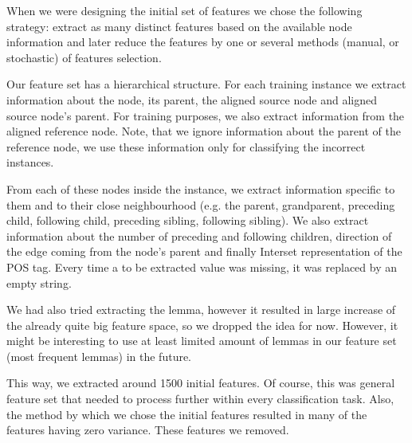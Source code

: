 When we were designing the initial set of features we chose the following
strategy: extract as many distinct features based on the available node information
and later reduce the features by one or several methods (manual, or stochastic)
of features selection.

Our feature set has a hierarchical structure. For each training instance we extract
information about the node, its parent, the aligned source node and aligned source node's
parent. For training purposes, we also extract information from the aligned reference
node. Note, that we ignore information about the parent of the reference node, we
use these information only for classifying the incorrect instances.

From each of these  nodes inside the instance, we extract information
specific to them and to their close neighbourhood (e.g. the parent, grandparent,
preceding child, following child, preceding sibling, following sibling). We
also extract information about the number of preceding and following children,
direction of the edge coming from the node's parent and finally Interset representation
of the POS tag. Every time a to be extracted value was missing, it was replaced by
an empty string.

We had also tried extracting the lemma, however it resulted in
large increase of the already quite big feature space, so we dropped the idea
for now. However, it might be interesting to use at least limited amount of lemmas in our
feature set (most frequent lemmas) in the future.

This way, we extracted around 1500 initial features. Of course, this was general feature
set that needed to process further within every classification task. Also, the method
by which we chose the initial features resulted in many of the features having zero
variance. These features we removed.


